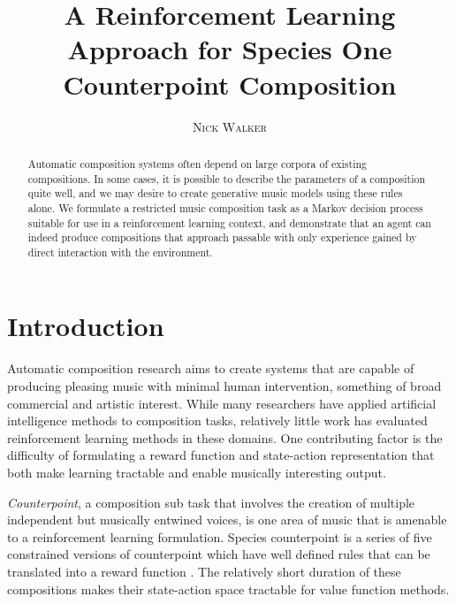 \documentclass{article}
\title{A Reinforcement Learning Approach for Species One Counterpoint Composition}
\author{\textsc{Nick Walker}}
\date{}
\begin{document}
\twocolumn
	\maketitle %



	\begin{abstract}
	Automatic composition systems often depend on large corpora of existing compositions. In some cases, it is possible to describe the parameters of a composition quite well, and we may desire to create generative music models using these rules alone. We formulate a restricted music composition task as a Markov decision process suitable for use in a reinforcement learning context, and demonstrate that an agent can indeed produce compositions that approach passable with only experience gained by direct interaction with the environment. 
	\end{abstract}


	\section{Introduction}
    Automatic composition research aims to create systems that are capable of producing pleasing music with minimal human intervention, something of broad commercial and artistic interest. While many researchers have applied artificial intelligence methods to composition tasks, relatively little work has evaluated reinforcement learning methods in these domains. One contributing factor is the difficulty of formulating a reward function and state-action representation that both make learning tractable and enable musically interesting output.

    \textit{Counterpoint}, a composition sub task that involves the creation of multiple independent but musically entwined voices, is one area of music that is amenable to a reinforcement learning formulation. Species counterpoint is a series of five constrained versions of counterpoint which have well defined rules that can be translated into a reward function \cite{Kostka2012}. The relatively short duration of these compositions makes their state-action space tractable for value function methods.
\end{document}
